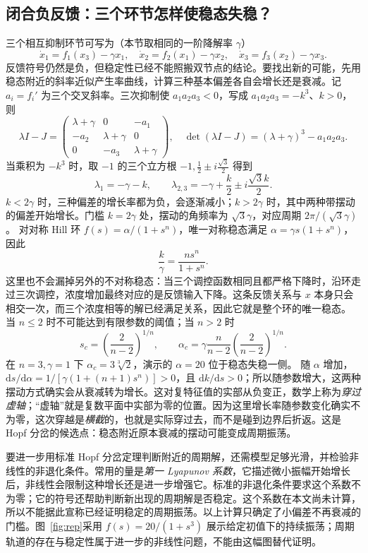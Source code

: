 \documentclass[11pt,a4paper,UTF8,fontset=fandol]{ctexart}
\newcommand{\dd}{\mathrm d}\newcommand{\R}{\mathbb R}\newcommand{\ssv}{\mathrm{ss}}
\begin{document}
\subsection{闭合负反馈：三个环节怎样使稳态失稳？}
三个相互抑制环节可写为（本节取相同的一阶降解率 $\gamma$）
\begin{equation}\dot x_1=f_1(x_3)-\gamma x_1,\quad\dot x_2=f_2(x_1)-\gamma x_2,\quad\dot x_3=f_3(x_2)-\gamma x_3.\end{equation}
反馈符号仍然是负，但稳定性已经不能照搬双节点的结论。要找出新的可能，先用稳态附近的斜率近似产生率曲线，计算三种基本偏差各自会增长还是衰减。记 $a_i=f_i'$ 为三个交叉斜率。三次抑制使 $a_1a_2a_3<0$，写成 $a_1a_2a_3=-k^3$、$k>0$，则
\[
\lambda I-J=\begin{pmatrix}\lambda+\gamma&0&-a_1\\-a_2&\lambda+\gamma&0\\0&-a_3&\lambda+\gamma\end{pmatrix},
\quad \det(\lambda I-J)=(\lambda+\gamma)^3-a_1a_2a_3.
\]
当乘积为 $-k^3$ 时，取 $-1$ 的三个立方根 $-1,\frac12\pm i\frac{\sqrt3}{2}$ 得到
\[
\lambda_1=-\gamma-k,\qquad\lambda_{2,3}=-\gamma+\frac k2\pm i\frac{\sqrt3k}{2}.
\]
$k<2\gamma$ 时，三种偏差的增长率都为负，会逐渐减小；$k>2\gamma$ 时，其中两种带摆动的偏差开始增长。门槛 $k=2\gamma$ 处，摆动的角频率为 $\sqrt3\gamma$，对应周期 $2\pi/(\sqrt3\gamma)$。
对对称 Hill 环 $f(s)=\alpha/(1+s^n)$，唯一对称稳态满足 $\alpha=\gamma s(1+s^n)$，因此
\[
\frac k\gamma=\frac{ns^n}{1+s^n}.
\]
这里也不会漏掉另外的不对称稳态：当三个调控函数相同且都严格下降时，沿环走过三次调控，浓度增加最终对应的是反馈输入下降。这条反馈关系与 $x$ 本身只会相交一次，而三个浓度相等的解已经满足关系，因此它就是整个环的唯一稳态。
当 $n\leq2$ 时不可能达到有限参数的阈值；当 $n>2$ 时
\[
s_c=\left(\frac2{n-2}\right)^{1/n},\qquad
\alpha_c=\gamma\frac n{n-2}\left(\frac2{n-2}\right)^{1/n}.
\]
在 $n=3,\gamma=1$ 下 $\alpha_c=3\sqrt[3]2$，演示的 $\alpha=20$ 位于稳态失稳一侧。
随 $\alpha$ 增加，$\dd s/\dd\alpha=1/[\gamma(1+(n+1)s^n)]>0$，且 $\dd k/\dd s>0$；所以随参数增大，这两种摆动方式确实会从衰减转为增长。这对复特征值的实部从负变正，数学上称为\emph{穿过虚轴}；“虚轴”就是复数平面中实部为零的位置。因为这里增长率随参数变化确实不为零，这次穿越是\emph{横截}的，也就是实际穿过去，而不是碰到边界后折返。这是 Hopf 分岔的候选点：稳态附近原本衰减的摆动可能变成周期振荡。

要进一步用标准 Hopf 分岔定理判断附近的周期解，还需模型足够光滑，并检验非线性的非退化条件。常用的量是\emph{第一 Lyapunov 系数}，它描述微小振幅开始增长后，非线性会限制这种增长还是进一步增强它。标准的非退化条件要求这个系数不为零；它的符号还帮助判断新出现的周期解是否稳定。这个系数在本文尚未计算，所以不能据此宣称已经证明稳定的周期振荡。以上计算只确定了小偏差不再衰减的门槛。图~\ref{fig:rep}采用 $f(s)=20/(1+s^3)$ 展示给定初值下的持续振荡；周期轨道的存在与稳定性属于进一步的非线性问题，不能由这幅图替代证明。
\end{document}

